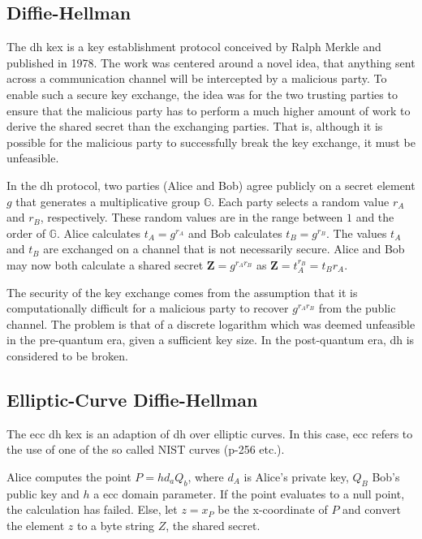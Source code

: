 \subsection{Diffie-Hellman}

The \acrfull{dh} \gls{kex} is a key establishment protocol conceived by Ralph Merkle and published in 1978. The work was centered around a novel idea, that anything sent across a communication channel will be intercepted by a malicious party. To enable such a secure key exchange, the idea was for the two trusting parties to ensure that the malicious party has to perform a much higher amount of work to derive the shared secret than the exchanging parties. That is, although it is possible for the malicious party to successfully break the key exchange, it must be unfeasible\cite{merkle1978}.

In the \gls{dh} protocol, two parties (Alice and Bob) agree publicly on a secret element $g$ that generates a multiplicative group $\mathbb{G}$. Each party selects a random value $r_A$ and $r_B$, respectively. These random values are in the range between $1$ and the order of $\mathbb{G}$. Alice calculates $t_A=g^{r_A}$ and Bob calculates $t_B=g^{r_B}$. The values $t_A$ and $t_B$ are exchanged on a channel that is not necessarily secure. Alice and Bob may now both calculate a shared secret $\mathbf{Z}=g^{r_A r_B}$ as $\mathbf{Z}=t_A^{r_B}=t_B{r_A}$\cite{merkle1978, boyd2020:diffie-hellman}.

The security of the key exchange comes from the assumption that it is computationally difficult for a malicious party to recover $g^{r_A r_B}$ from the public channel. The problem is that of a discrete logarithm which was deemed unfeasible in the pre-quantum era, given a sufficient key size\cite{boyd2020:diffie-hellman}. In the post-quantum era, \gls{dh} is considered to be broken\cite{bernstein2017}.

\subsection{Elliptic-Curve Diffie-Hellman}

The \acrfull{ecc} \acrfull{dh} \gls{kex} is an adaption of \gls{dh} over elliptic curves. In this case, \gls{ecc} refers to the use of one of the so called NIST curves (\gls{p-256} etc.)\cite{nist2018}.

Alice computes the point $P=hd_aQ_b$, where $d_A$ is Alice's private key, $Q_B$ Bob's public key and $h$ a \gls{ecc} domain parameter. If the point evaluates to a null point, the calculation has failed. Else, let $z=x_P$ be the x-coordinate of $P$ and convert the element $z$ to a byte string $Z$, the shared secret.

